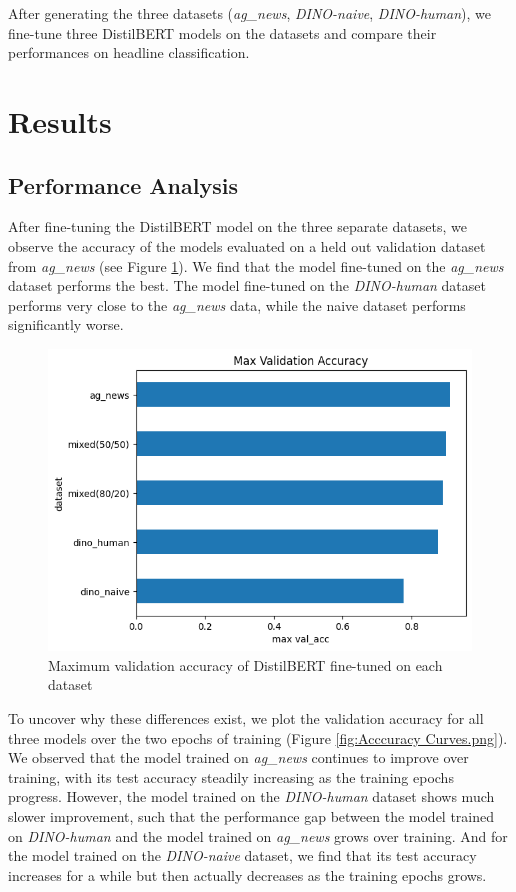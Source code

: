 \documentclass[11pt]{article}
\begin{document}
After generating the three datasets (\textit{ag\_news}, \textit{DINO-naive}, \textit{DINO-human}), we fine-tune three DistilBERT models on the datasets and compare their performances on headline classification.



\section{Results}

\subsection{Performance Analysis}

After fine-tuning the DistilBERT model on the three separate datasets, we observe the accuracy of the models evaluated on a held out validation dataset from \textit{ag\_news} (see Figure \ref{fig:maxvalacc}). We find that the model fine-tuned on the \textit{ag\_news} dataset performs the best. The model fine-tuned on the \textit{DINO-human} dataset performs very close to the \textit{ag\_news} data, while the naive dataset performs significantly worse.

\begin{figure}[]
    \centering
    \includegraphics[width=0.99\linewidth]{Accuracy Bar Graph.png}
    \caption{Maximum validation accuracy of DistilBERT fine-tuned on each dataset}
    \label{fig:maxvalacc}
\end{figure}

To uncover why these differences exist, we plot the validation accuracy for all three models over the two epochs of training (Figure \ref{fig:Acccuracy Curves.png}). We observed that the model trained on \textit{ag\_news} continues to improve over training, with its test accuracy steadily increasing as the training epochs progress. However, the model trained on the \textit{DINO-human} dataset shows much slower improvement, such that the performance gap between the model trained on \textit{DINO-human} and the model trained on \textit{ag\_news} grows over training. And for the model trained on the \textit{DINO-naive} dataset, we find that its test accuracy increases for a while but then actually decreases as the training epochs grows.
\end{document}
